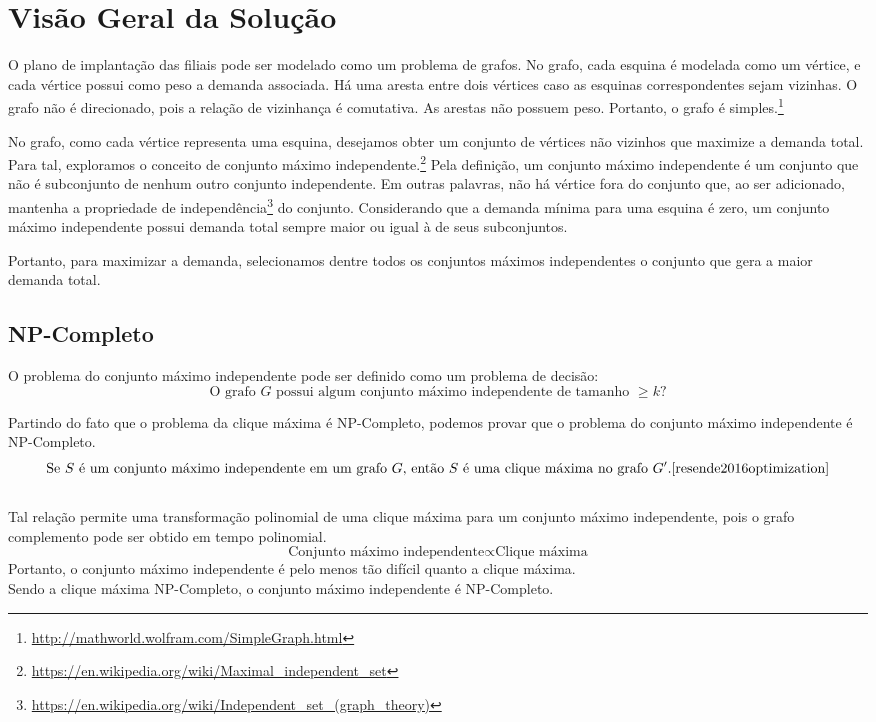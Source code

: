 \documentclass{article}
\begin{document}
\section{Visão Geral da Solução}
O plano de implantação das filiais pode ser modelado como um problema de grafos. No grafo, cada esquina é modelada como um vértice, e cada vértice possui como peso a demanda associada. Há uma aresta entre dois vértices caso as esquinas correspondentes sejam vizinhas. O grafo não é direcionado, pois a relação de vizinhança é comutativa. As arestas não possuem peso. Portanto, o grafo é simples.\footnote{\url{http://mathworld.wolfram.com/SimpleGraph.html}}

No grafo, como cada vértice representa uma esquina, desejamos obter um conjunto de vértices não vizinhos que maximize a demanda total. Para tal, exploramos o conceito de conjunto máximo independente.\footnote{\url{https://en.wikipedia.org/wiki/Maximal_independent_set}} Pela definição, um conjunto máximo independente é um conjunto que não é subconjunto de nenhum outro conjunto independente. Em outras palavras, não há vértice fora do conjunto que, ao ser adicionado, mantenha a propriedade de independência\footnote{\url{https://en.wikipedia.org/wiki/Independent_set_(graph_theory)}} do conjunto. Considerando que a demanda mínima para uma esquina é zero, um conjunto máximo independente possui demanda total sempre maior ou igual à de seus subconjuntos.

Portanto, para maximizar a demanda, selecionamos dentre todos os conjuntos máximos independentes o conjunto que gera a maior demanda total.

\subsection{NP-Completo}
O problema do conjunto máximo independente pode ser definido como um problema de decisão:
\[ \text{O grafo $G$ possui algum conjunto máximo independente de tamanho $\geq k$?} \]

Partindo do fato que o problema da clique máxima é NP-Completo\cite{Karp1972}, podemos provar que o problema do conjunto máximo independente é NP-Completo.
\begin{equation} \label{eq:cmi-clique}
  \text{Se $S$ é um conjunto máximo independente em um grafo $G$, então $S$ é uma clique máxima no grafo $G'$.}\cite{resende2016optimization}
\end{equation}
\\[-5pt]
Tal relação permite uma transformação polinomial de uma clique máxima para um conjunto máximo \mbox{independente}, pois o grafo complemento pode ser obtido em tempo polinomial.\cite{resende2016optimization}
\[ \text{Conjunto máximo independente} \propto \text{Clique máxima} \]
Portanto, o conjunto máximo independente é pelo menos tão difícil quanto a clique máxima. \\
Sendo a clique máxima NP-Completo, o conjunto máximo independente é NP-Completo.
\end{document}
